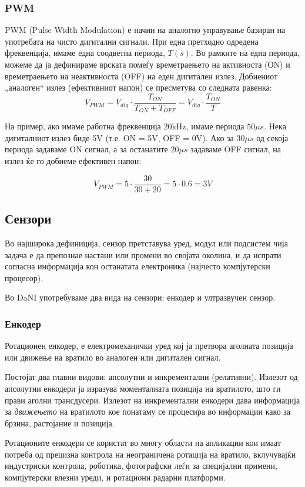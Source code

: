 \documentclass[12pt]{article}
\begin{document}
	\subsubsection{PWM}
		PWM (Pulse Width Modulation) е начин на аналогно управување базиран на употребата на чисто дигитални сигнали. При една претходно одредена фреквенција, имаме една соодветна периода, $T(s)$. Во рамките на една периода, можеме да ја дефинираме врската помеѓу времетраењето на активноста (ОN) и времетраењето на неактивноста (OFF) на еден дигитален излез. Добиениот „аналоген“ излез (ефективниот напон) се пресметува со следната равенка:\\

		$$ V_{PWM} = V_{dig} \cdot \frac{T_{ON}}{T_{ON} + T_{OFF}} = V_{dig} \cdot \frac{T_{ON}}{T} $$

		На пример, ако имаме работна фреквенција 20kHz, имаме периода $50\mu s$. Нека дигиталниот излез биде 5V (т.е. ON = 5V, OFF = 0V). Ако за $30\mu s$ од секоја периода задаваме ON сигнал, а за останатите $20\mu s$ задаваме OFF сигнал, на излез ќе го добиеме ефективен напон:

		$$ V_{PWM} = 5 \cdot \frac{30}{30+20} = 5 \cdot 0.6 = 3V $$

  \subsection{Сензори}
		Во најширока дефиниција, сензор претставува уред, модул или подсистем чија задача е да препознае настани или промени во својата околина, и да испрати согласна информација кон останатата електроника (најчесто компјутерски процесор).

		Во DaNI употребуваме два вида на сензори: енкодер и ултразвучен сензор.

  \subsubsection{Енкодер}
		Ротационен енкодер, е електромеханички уред кој ја претвора аголната позиција или движење на вратило во аналоген или дигитален сигнал.

		Постојат два главни видови: апсолутни и инкрементални (релативни). Излезот од апсолутни енкодери ја изразува моменталната позиција на вратилото, што ги прави аголни трансдусери. Излезот на инкрементални енкодери дава информација за \textit{движењето} на вратилото кое понатаму се процесира во информации како за брзина, растојание и позиција.

		Ротационите енкодери се користат во многу области на апликации кои имаат потреба од прецизна контрола на неограничена ротација на вратило, вклучувајќи индустриски контрола, роботика, фотографски леѓи за специјални примени, компјутерски влезни уреди, и ротациони радарни платформи.
\end{document}
